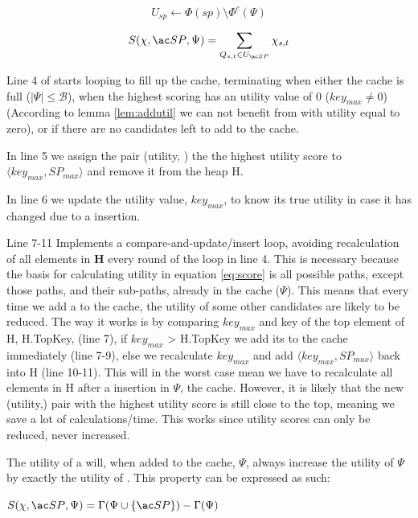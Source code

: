 \begin{equation} \label{eq:usp}
U_{sp} \leftarrow \Phi(sp) \setminus \Phi^c(\Psi)
\end{equation}

\begin{equation} \label{eq:score}
S(\chi, \spath, \Psi) = \sum\limits_{Q_{s,t} \in U_{\spath}} \chi_{s,t}
\end{equation}


Line 4 of \salgo starts looping to fill up the cache, terminating when either the cache is full ($| \Psi | \leq  \mathcal{B}$), when the highest scoring \spath has an utility value of 0 ($key_{max} \neq 0$) (According to lemma \ref{lem:addutil} we can not benefit from \spaths with utility equal to zero), or if there are no \spath candidates left to add to the cache.

In line 5 we assign the pair (utility, \spath) the the highest utility score to $\langle  key_{max},  SP_{max} \rangle$ and remove it from the heap H.

In line 6 we update the utility value, $key_{max}$, to know its true utility in case it has changed due to a \spath insertion.

Line 7-11 Implements a compare-and-update/insert loop, avoiding recalculation of all elements in \textbf{H} every round of the loop in line 4. This is necessary because the basis for calculating utility in equation \ref{eq:score} is all possible paths, except those paths, and their sub-paths, already in the cache ($\Psi$). This means that every time we add a \spath to the cache, the utility of some other candidates are likely to be reduced. The way it works is by comparing $key_{max}$ and key of the top element of H, H.TopKey, (line 7), if $key_{max}$ >  H.TopKey we add its \spath to the cache immediately (line 7-9), else we recalculate $key_{max}$ and add $\langle  key_{max},  SP_{max} \rangle$ back into H (line 10-11). This will in the worst case mean we have to recalculate all elements in H after a \spath insertion in $\Psi$, the cache. However, it is likely that the new (utility,\spath) pair with the highest utility score is still close to the top, meaning we save a lot of calculations/time. This works since utility scores can only be reduced, never increased.


\begin{lemma}\label{lem:addutil}
The utility of a \spath will, when added to the cache, $\Psi$, always increase the utility of $\Psi$ by exactly the utility of \spath. This property can be expressed as such:

$S(\chi, \spath, \Psi) = \Gamma(\Psi \cup \{\spath\}) - \Gamma(\Psi)$

\end{lemma}

